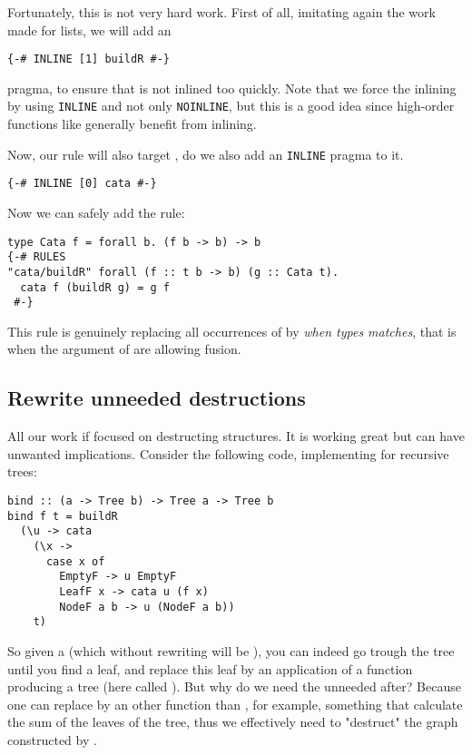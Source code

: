 Fortunately, this is not very hard work. First of all, imitating again the work made for lists, we will add an 
\begin{verbatim}
{-# INLINE [1] buildR #-}
\end{verbatim}
pragma, to ensure that  is not inlined too quickly. Note that we force the inlining by using \verb|INLINE| and not only \verb|NOINLINE|, but this is a good idea since high-order functions like  generally benefit from inlining. 

Now, our rule will also target , do we also add an \verb|INLINE| pragma to it.
\begin{verbatim}
{-# INLINE [0] cata #-}
\end{verbatim}

Now we can safely add the rule:
\begin{verbatim}
type Cata f = forall b. (f b -> b) -> b
{-# RULES
"cata/buildR" forall (f :: t b -> b) (g :: Cata t).
  cata f (buildR g) = g f
 #-}
\end{verbatim}
This rule is genuinely replacing all occurrences of  by  \emph{when types matches}, that is when the argument of  are allowing fusion.

\subsection{Rewrite unneeded destructions}
All our work if focused on destructing structures. It is working great but can have unwanted implications. Consider the following code, implementing  for recursive trees:

\begin{verbatim}
bind :: (a -> Tree b) -> Tree a -> Tree b
bind f t = buildR
  (\u -> cata
    (\x ->
      case x of
        EmptyF -> u EmptyF
        LeafF x -> cata u (f x)
        NodeF a b -> u (NodeF a b))
    t)
\end{verbatim}

So given a  (which without rewriting will be ), you can indeed go trough the tree until you find a leaf, and replace this leaf by an application of a function producing a tree (here called ). But why do we need the unneeded  after? Because one can replace  by an other function than , for example, something that calculate the sum of the leaves of the tree, thus we effectively need to "destruct" the graph constructed by .

